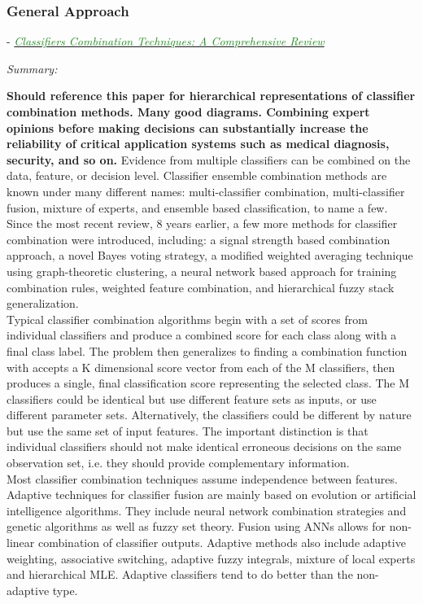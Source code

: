 \documentclass[]{article}
\newcommand{\paperentry}[4]{
            \hangindent=1cm
            \textcolor{red}{\cite{#1}} - \href{run:../References/#3}{\textcolor{ForestGreen}{\textit{#2}}}
            
            \noindent            
            \begin{minipage}[t]{0.1\linewidth}\hfill\end{minipage}
            \begin{minipage}[t]{0.8\linewidth}\textcolor{NavyBlue}{{\textit{Summary:}}}#4\end{minipage}
            \vspace{.25cm}
          }
\begin{document}
		\subsubsection{General Approach}
			\paperentry{Mohandes2018ClassifierCombinationTechniquesReview}
			{Classifiers Combination Techniques: A Comprehensive Review}
			{Fusion/Reviews/Mohandes2018ClassifierCombinationTechniquesReview.pdf}
			{} \newline
			\textbf{Should reference this paper for hierarchical representations of classifier combination methods.  Many good diagrams.  Combining expert opinions before making decisions can substantially increase the reliability of critical application systems such as medical diagnosis, security, and so on.}  Evidence from multiple classifiers can be combined on the data, feature, or decision level.  Classifier ensemble combination methods are known under many different names: multi-classifier combination, multi-classifier fusion, mixture of experts, and ensemble based classification, to name a few.  Since the most recent review, 8 years earlier, a few more methods for classifier combination were introduced, including: a signal strength based combination approach, a novel Bayes voting strategy, a modified weighted averaging technique using graph-theoretic clustering, a neural network based approach for training combination rules, weighted feature  combination, and hierarchical fuzzy stack generalization. \\
			\noindent
			Typical classifier combination algorithms begin with a set of scores from individual classifiers and produce a combined score for each class along with a final class label.  The problem then generalizes to finding a combination function with accepts a K dimensional score vector from each of the M classifiers, then produces a single, final classification score representing the selected class.  The M classifiers could be identical but use different feature sets as inputs, or use different parameter sets.  Alternatively, the classifiers could be different by nature but use the same set of input features.  The important distinction is that individual classifiers should not make identical erroneous decisions on the same observation set, i.e. they should provide complementary information. \\
			\noindent
			Most classifier combination techniques assume independence between features. \\
			\noindent Adaptive techniques for classifier fusion are mainly based on evolution or artificial intelligence algorithms.  They include neural network combination strategies and genetic algorithms as well as fuzzy set theory. Fusion using ANNs allows for non-linear combination of classifier outputs.  Adaptive methods also include adaptive weighting, associative switching, adaptive fuzzy integrals, mixture of local experts and hierarchical MLE.  Adaptive classifiers tend to do better than the non-adaptive type.  \\ 
\end{document}
